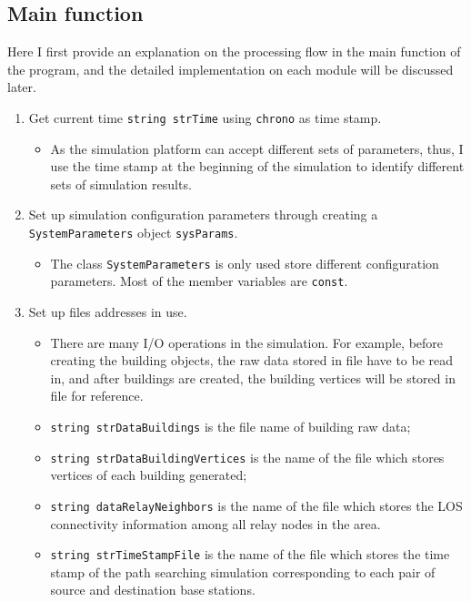 \documentclass[paper=a4, fontsize=11pt]{scrartcl}
\numberwithin{equation}{section}		%
\numberwithin{figure}{section}			%
\numberwithin{table}{section}				%
\begin{document}
\subsection{Main function}
Here I first provide an explanation on the processing flow in the main function of the program, and the detailed implementation on each module will be discussed later.
\begin{enumerate}
	\item Get current time \verb|string strTime| using \verb|chrono| as time stamp.
	\begin{itemize}
		\item As the simulation platform can accept different sets of parameters, thus, I use the time stamp at the beginning of the simulation to identify different sets of simulation results.
	\end{itemize}
	
	\item Set up simulation configuration parameters through creating a \verb|SystemParameters| object \verb|sysParams|.
	\begin{itemize}
		\item The class \verb|SystemParameters| is only used store different configuration parameters. Most of the member variables are \verb|const|.
	\end{itemize}
	
	\item Set up files addresses in use.
	\begin{itemize}
		\item There are many I/O operations in the simulation. For example, before creating the building objects, the raw data stored in file have to be read in, and after buildings are created, the building vertices will be stored in file for reference.
		\item \verb|string strDataBuildings| is the file name of building raw data;
		\item \verb|string strDataBuildingVertices| is the name of the file which stores vertices of each building generated;
		\item \verb|string dataRelayNeighbors| is the name of the file which stores the LOS connectivity information among all relay nodes in the area.
		\item \verb|string strTimeStampFile| is the name of the file which stores the time stamp of the path searching simulation corresponding to each pair of source and destination base stations. 
	\end{itemize}
	

\end{enumerate}
\end{document}
